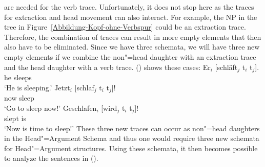 are needed for the verb trace. Unfortunately, it does not stop here as the traces for extraction and
head movement can also interact. For example, the NP in the tree in 
Figure~\ref{Abbildung-Kopf-ohne-Verbspur} could be an extraction trace. Therefore, the combination of traces can result in more empty elements that then
also have to be eliminated. Since we have three schemata, we will have three new empty elements if we combine the non"=head daughter with an extraction
trace and the head daughter with a verb trace. () shows these cases:
\eal\settowidth{}
\ex 
\gll Er$_i$    [schläft$_j$ t$_i$ t$_j$].\\
	 he \spacebr{}sleeps\\  
\glt `He is sleeping.'
\ex 
\gll Jetzt$_i$ [schlaf$_j$ t$_i$ t$_j$]!\\
	 now \spacebr{}sleep\\   
\glt `Go to sleep now!'
\ex 
\gll Geschlafen$_i$ [wird$_j$ t$_i$ t$_j$]! \\
	 slept \spacebr{}is\\
\glt `Now is time to sleep!'
\zl
These three new traces can occur as non"=head daughters in the Head"=Argument Schema and thus one would require
three new schemata for Head"=Argument structures. Using these schemata, it then becomes possible to analyze
the sentences in ().

